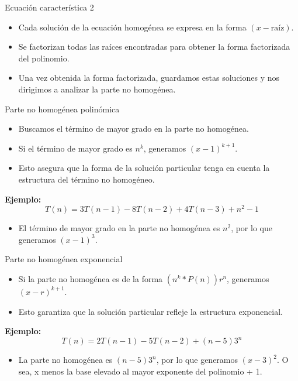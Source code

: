 \documentclass[aspectratio=169]{beamer}
\begin{document}
\begin{frame}{Ecuación característica 2}
\begin{itemize}
    \item Cada solución de la ecuación homogénea se expresa en la forma \( (x - \text{raíz}) \).
    \item Se factorizan todas las raíces encontradas para obtener la forma factorizada del polinomio.
    \item Una vez obtenida la forma factorizada, guardamos estas soluciones y nos dirigimos a analizar la parte no homogénea.
\end{itemize}
\end{frame}

\begin{frame}{Parte no homogénea polinómica}
\begin{itemize}
    \item Buscamos el término de mayor grado en la parte no homogénea.
    \item Si el término de mayor grado es \( n^k \), generamos \( (x - 1)^{k+1} \).
    \item Esto asegura que la forma de la solución particular tenga en cuenta la estructura del término no homogéneo.
\end{itemize}

\textbf{Ejemplo:}
\[
T(n) = 3T(n-1) - 8T(n-2) + 4T(n-3) + n^2 - 1
\]
\begin{itemize}
    \item El término de mayor grado en la parte no homogénea es \( n^2 \), por lo que generamos \( (x - 1)^3 \).
\end{itemize}
\end{frame}

\begin{frame}{Parte no homogénea exponencial}
\begin{itemize}
    \item Si la parte no homogénea es de la forma \( (n^k * P(n))r^n \), generamos \( (x - r)^{k+1} \).
    \item Esto garantiza que la solución particular refleje la estructura exponencial.
\end{itemize}

\textbf{Ejemplo:}
\[
T(n) = 2T(n-1) - 5T(n-2) + (n-5)3^n
\]
\begin{itemize}
    \item La parte no homogénea es \( (n-5)3^n \), por lo que generamos \( (x - 3)^2 \). O sea, x menos la base elevado al mayor exponente del polinomio + 1.
\end{itemize}
\end{frame}
\end{document}
